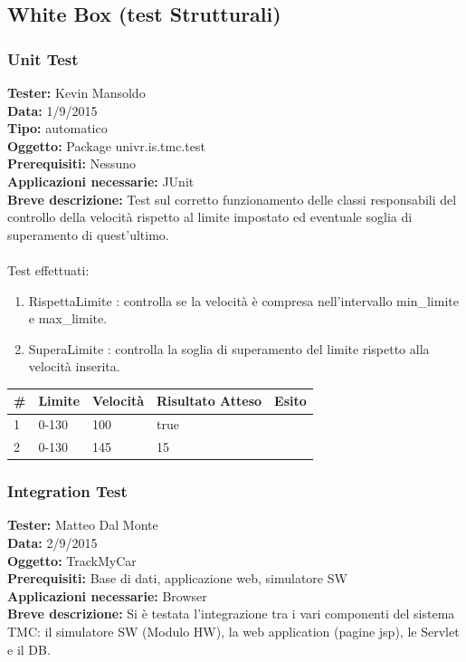 \documentclass[a4paper,12pt]{article}
\begin{document}
\subsection{White Box (test Strutturali)}
\subsubsection{Unit Test}
\textbf{Tester:} Kevin Mansoldo\\
\textbf{Data:} 1/9/2015\\
\textbf{Tipo:} automatico\\
\textbf{Oggetto:} Package univr.is.tmc.test\\
\textbf{Prerequisiti:} Nessuno\\
\textbf{Applicazioni necessarie:} JUnit\\
\textbf{Breve descrizione:} Test sul corretto funzionamento delle classi responsabili del controllo della velocità  rispetto al limite impostato ed eventuale soglia di superamento di quest'ultimo.\\ \\

Test effettuati:
\begin{enumerate}
\item RispettaLimite : controlla se la velocità è compresa nell'intervallo min\_limite e max\_limite.
\item SuperaLimite : controlla la soglia di superamento del limite rispetto alla velocità inserita.
\end{enumerate}



\begin{table}[ht]
\begin{center}
\begin{tabular}{p{1cm} p{3cm} p{3cm} p{3cm} p{2cm}}
\rowcolor{Ash}
\hline
\# & Limite & Velocità & Risultato Atteso & Esito \\ \hline
1 & 0-130 & 100 & true & \cellcolor{green}{OK}\\
2 & 0-130 & 145 & 15 & \cellcolor{green}{OK}\\ \hline
\end{tabular}
\end{center}
\end{table}

\pagebreak

\subsubsection{Integration Test}
\textbf{Tester:} Matteo Dal Monte\\
\textbf{Data:} 2/9/2015\\
\textbf{Oggetto:} TrackMyCar\\
\textbf{Prerequisiti:} Base di dati, applicazione web, simulatore SW\\
\textbf{Applicazioni necessarie:} Browser\\
\textbf{Breve descrizione:} Si è testata l'integrazione tra i vari componenti del sistema TMC: il simulatore SW (Modulo HW), la web application (pagine jsp), le Servlet e il DB.\\
\end{document}
